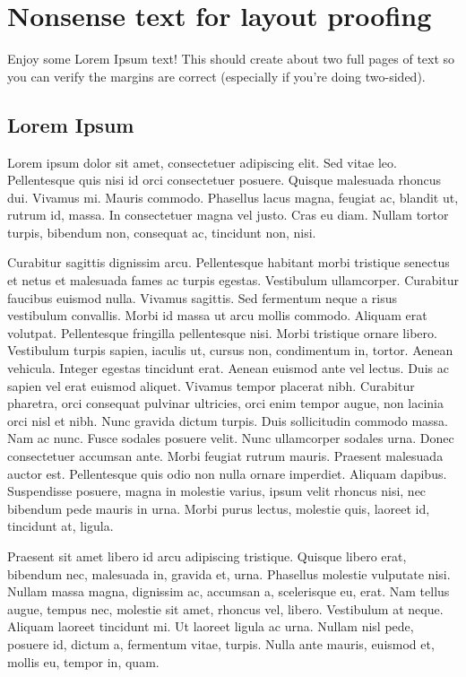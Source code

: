 \chapter{Nonsense text for layout proofing}
\label{hello}

Enjoy some Lorem Ipsum text!
This should create about two full pages of text so you can verify the
margins are correct (especially if you're doing two-sided).

\section{Lorem Ipsum}
Lorem ipsum dolor sit amet, consectetuer adipiscing elit. Sed vitae leo.
Pellentesque quis nisi id orci consectetuer posuere. Quisque malesuada
rhoncus dui. Vivamus mi. Mauris commodo. Phasellus lacus magna, feugiat ac,
blandit ut, rutrum id, massa. In consectetuer magna vel justo. Cras eu
diam. Nullam tortor turpis, bibendum non, consequat ac, tincidunt non,
nisi. 

Curabitur sagittis dignissim arcu. Pellentesque habitant morbi
tristique senectus et netus et malesuada fames ac turpis egestas.
Vestibulum ullamcorper. Curabitur faucibus euismod nulla. Vivamus sagittis.
Sed fermentum neque a risus vestibulum convallis. Morbi id massa ut arcu
mollis commodo. Aliquam erat volutpat.  Pellentesque fringilla pellentesque
nisi. Morbi tristique ornare libero. Vestibulum turpis sapien, iaculis ut,
cursus non, condimentum in, tortor. Aenean vehicula. Integer egestas
tincidunt erat. Aenean euismod ante vel lectus. Duis ac sapien vel erat
euismod aliquet. Vivamus tempor placerat nibh. Curabitur pharetra, orci
consequat pulvinar ultricies, orci enim tempor augue, non lacinia orci nisl
et nibh. Nunc gravida dictum turpis.  Duis sollicitudin commodo massa. Nam
ac nunc. Fusce sodales posuere velit. Nunc ullamcorper sodales urna. Donec
consectetuer accumsan ante. Morbi feugiat rutrum mauris. Praesent malesuada
auctor est. Pellentesque quis odio non nulla ornare imperdiet. Aliquam
dapibus. Suspendisse posuere, magna in molestie varius, ipsum velit rhoncus
nisi, nec bibendum pede mauris in urna. Morbi purus lectus, molestie quis,
laoreet id, tincidunt at, ligula. 

Praesent sit amet libero id arcu
adipiscing tristique. Quisque libero erat, bibendum nec, malesuada in,
gravida et, urna. Phasellus molestie vulputate nisi. Nullam massa magna,
dignissim ac, accumsan a, scelerisque eu, erat. Nam tellus augue, tempus
nec, molestie sit amet, rhoncus vel, libero. Vestibulum at neque. Aliquam
laoreet tincidunt mi. Ut laoreet ligula ac urna. Nullam nisl pede, posuere
id, dictum a, fermentum vitae, turpis.  Nulla ante mauris, euismod et,
mollis eu, tempor in, quam. 

